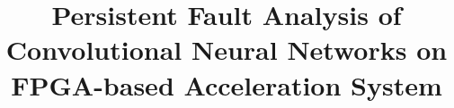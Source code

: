 \documentclass[conference]{IEEEtran}
\begin{document}
\title{Persistent Fault Analysis of Convolutional Neural Networks on FPGA-based Acceleration System}


\maketitle
\end{document}
